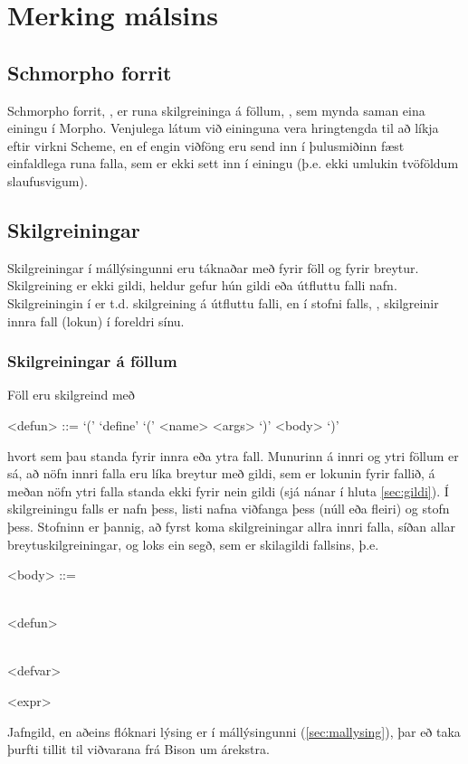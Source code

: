 \documentclass[a4paper,icelandic]{article}
\begin{document}
\section{Merking málsins}
\label{sec:merking-malsins}

\subsection{Schmorpho forrit}
\label{sec:schmorpho-forrit}

Schmorpho forrit, , er runa skilgreininga á föllum,
, sem mynda saman eina einingu í Morpho. Venjulega látum
við eininguna vera hringtengda til að líkja eftir virkni Scheme, en
ef engin viðföng eru send inn í þulusmiðinn fæst einfaldlega runa
falla, sem er ekki sett inn í einingu (þ.e. ekki umlukin tvöföldum
slaufusvigum). 

\subsection{Skilgreiningar}
\label{sec:skilgreiningar}

Skilgreiningar í mállýsingunni eru táknaðar með  fyrir
föll og  fyrir breytur.
Skilgreining er ekki gildi, heldur gefur hún gildi eða útfluttu
falli nafn. Skilgreiningin  í  er
t.d. skilgreining á útfluttu falli, en   í stofni falls,
, skilgreinir innra fall (lokun) í foreldri sínu.

\subsubsection{Skilgreiningar á föllum}
\label{sec:skilgr-foll}

Föll eru skilgreind með
\begin{grammar}
  <defun> ::= `(' `define' `(' <name> <args> `)' <body> `)'
\end{grammar}
hvort sem þau standa fyrir innra eða ytra fall. Munurinn á innri og
ytri föllum er sá, að nöfn innri falla eru líka breytur með gildi, sem
er lokunin fyrir fallið, á meðan nöfn ytri falla standa ekki fyrir
nein gildi (sjá nánar í hluta \ref{sec:gildi}).  Í skilgreiningu falls
er  nafn þess,  listi nafna viðfanga þess (núll
eða fleiri) og  stofn þess. Stofninn er þannig, að fyrst
koma skilgreiningar allra innri falla, síðan allar
breytuskilgreiningar, og loks ein segð, sem er skilagildi fallsins,
þ.e.
\begin{grammar}
  <body> ::=
  \begin{syntdiag*}
    \begin{rep}
      \\
      <defun>
    \end{rep}
    \begin{rep}
      \\
      <defvar>
    \end{rep}
    <expr>
  \end{syntdiag*}
\end{grammar}
Jafngild, en aðeins flóknari lýsing er í mállýsingunni
(\ref{sec:mallysing}), þar eð taka þurfti tillit til viðvarana frá
Bison um árekstra. 
\end{document}
